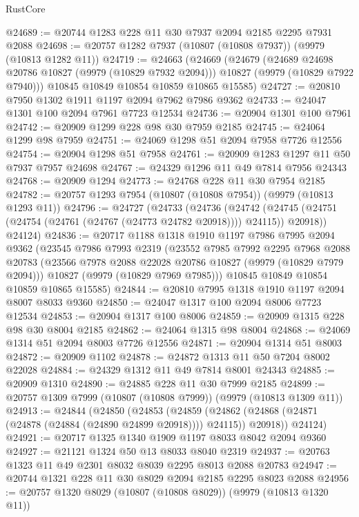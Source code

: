 \begin{lexlean}{RustCore}
\begin{coremodule}
@24689 := @20744 @1283 @228 @11 @30 @7937 @2094 @2185 @2295 @7931 @2088
@24698 := @20757 @1282 @7937 (@10807 (@10808 @7937)) (@9979 (@10813 @1282 @11))
@24719 := @24663
    (@24669
      (@24679
        (@24689 @24698 @20786 @10827 (@9979 (@10829 @7932 @2094)))
        @10827
        (@9979 (@10829 @7922 @7940)))
      @10845
      @10849
      @10854
      @10859
      @10865
      @15585)
@24727 := @20810 @7950 @1302 @1911 @1197 @2094 @7962 @7986 @9362
@24733 := @24047 @1301 @100 @2094 @7961 @7723 @12534
@24736 := @20904 @1301 @100 @7961
@24742 := @20909 @1299 @228 @98 @30 @7959 @2185
@24745 := @24064 @1299 @98 @7959
@24751 := @24069 @1298 @51 @2094 @7958 @7726 @12556
@24754 := @20904 @1298 @51 @7958
@24761 := @20909 @1283 @1297 @11 @50 @7937 @7957 @24698
@24767 := @24329 @1296 @11 @49 @7814 @7956 @24343
@24768 := @20909 @1294
@24773 := @24768 @228 @11 @30 @7954 @2185
@24782 := @20757 @1293 @7954 (@10807 (@10808 @7954)) (@9979 (@10813 @1293 @11))
@24796 := @24727
    (@24733
      (@24736
        (@24742 (@24745 (@24751 (@24754 (@24761 (@24767 (@24773 @24782 @20918)))) @24115)) @20918))
      @24124)
@24836 := @20717
    @1188
    @1318
    @1910
    @1197
    @7986
    @7995
    @2094
    @9362
    (@23545
      @7986
      @7993
      @2319
      (@23552
        @7985
        @7992
        @2295
        @7968
        @2088
        @20783
        (@23566 @7978 @2088 @22028 @20786 @10827 (@9979 (@10829 @7979 @2094)))
        @10827
        (@9979 (@10829 @7969 @7985)))
      @10845
      @10849
      @10854
      @10859
      @10865
      @15585)
@24844 := @20810 @7995 @1318 @1910 @1197 @2094 @8007 @8033 @9360
@24850 := @24047 @1317 @100 @2094 @8006 @7723 @12534
@24853 := @20904 @1317 @100 @8006
@24859 := @20909 @1315 @228 @98 @30 @8004 @2185
@24862 := @24064 @1315 @98 @8004
@24868 := @24069 @1314 @51 @2094 @8003 @7726 @12556
@24871 := @20904 @1314 @51 @8003
@24872 := @20909 @1102
@24878 := @24872 @1313 @11 @50 @7204 @8002 @22028
@24884 := @24329 @1312 @11 @49 @7814 @8001 @24343
@24885 := @20909 @1310
@24890 := @24885 @228 @11 @30 @7999 @2185
@24899 := @20757 @1309 @7999 (@10807 (@10808 @7999)) (@9979 (@10813 @1309 @11))
@24913 := @24844
    (@24850
      (@24853
        (@24859 (@24862 (@24868 (@24871 (@24878 (@24884 (@24890 @24899 @20918)))) @24115)) @20918))
      @24124)
@24921 := @20717 @1325 @1340 @1909 @1197 @8033 @8042 @2094 @9360
@24927 := @21121 @1324 @50 @13 @8033 @8040 @2319
@24937 := @20763 @1323 @11 @49 @2301 @8032 @8039 @2295 @8013 @2088 @20783
@24947 := @20744 @1321 @228 @11 @30 @8029 @2094 @2185 @2295 @8023 @2088
@24956 := @20757 @1320 @8029 (@10807 (@10808 @8029)) (@9979 (@10813 @1320 @11))

\end{coremodule}
\end{lexlean}
